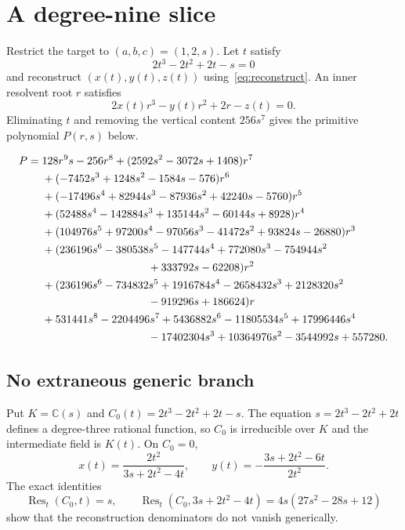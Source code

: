 \documentclass[11pt]{article}
\newcommand{\C}{\mathbb C}
\begin{document}
\section{A degree-nine slice}

Restrict the target to $(a,b,c)=(1,2,s)$. Let $t$ satisfy
\[
2t^3-2t^2+2t-s=0
\]
and reconstruct $(x(t),y(t),z(t))$ using~\eqref{eq:reconstruct}. An inner
resolvent root $r$ satisfies
\[
2x(t)r^3-y(t)r^2+2r-z(t)=0.
\]
Eliminating $t$ and removing the vertical content $256s^7$ gives the primitive
polynomial $P(r,s)$ below.

\begingroup\small
\begin{align*}
P={}&128r^9s-256r^8
+(2592s^2-3072s+1408)r^7\\
&+(-7452s^3+1248s^2-1584s-576)r^6\\
&+(-17496s^4+82944s^3-87936s^2+42240s-5760)r^5\\
&+(52488s^4-142884s^3+135144s^2-60144s+8928)r^4\\
&+(104976s^5+97200s^4-97056s^3-41472s^2+93824s-26880)r^3\\
&+(236196s^6-380538s^5-147744s^4+772080s^3-754944s^2\\
&\hspace{34mm}+333792s-62208)r^2\\
&+(236196s^6-734832s^5+1916784s^4-2658432s^3+2128320s^2\\
&\hspace{34mm}-919296s+186624)r\\
&+531441s^8-2204496s^7+5436882s^6-11805534s^5+17996446s^4\\
&\hspace{34mm}-17402304s^3+10364976s^2-3544992s+557280.
\end{align*}
\endgroup

\subsection{No extraneous generic branch}

Put $K=\C(s)$ and $C_0(t)=2t^3-2t^2+2t-s$.  The equation
$s=2t^3-2t^2+2t$ defines a degree-three rational function, so $C_0$ is
irreducible over $K$ and the intermediate field is $K(t)$.  On $C_0=0$,
\[
x(t)=\frac{2t^2}{3s+2t^2-4t},\qquad
y(t)=-\frac{3s+2t^2-6t}{2t^2}.
\]
The exact identities
\[
\operatorname{Res}_t(C_0,t)=s,\qquad
\operatorname{Res}_t(C_0,3s+2t^2-4t)=4s(27s^2-28s+12)
\]
show that the reconstruction denominators do not vanish generically.
\end{document}
